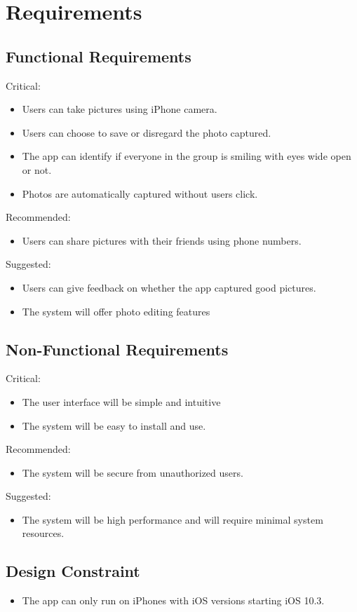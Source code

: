 \chapter{Requirements}

\section{Functional Requirements}
Critical:
\begin{itemize}
 \item Users can take pictures using iPhone camera.
 \item Users can choose to save or disregard the photo captured.
 \item The app can identify if everyone in the group is smiling with eyes wide open or not.
 \item Photos are automatically captured without users click.
 \end{itemize}
 
Recommended:
\begin{itemize}
\item Users can share pictures with their friends using phone numbers.
 \end{itemize}
 
Suggested:
\begin{itemize}
\item Users can give feedback on whether the app captured good pictures.
\item The system will offer photo editing features
 \end{itemize}
 
\section{Non-Functional Requirements}
Critical: 
\begin{itemize}
\item The user interface will be simple and intuitive 
\item The system will be easy to install and use.
 \end{itemize}
 
Recommended:
\begin{itemize}
\item The system will be secure from unauthorized users. 
 \end{itemize}
 
Suggested:
\begin{itemize}
\item The system will be high performance and will require minimal system resources.
 \end{itemize}
\section{Design Constraint}
\begin{itemize}
\item The app can only run on iPhones with iOS versions starting iOS  10.3.
 \end{itemize}
